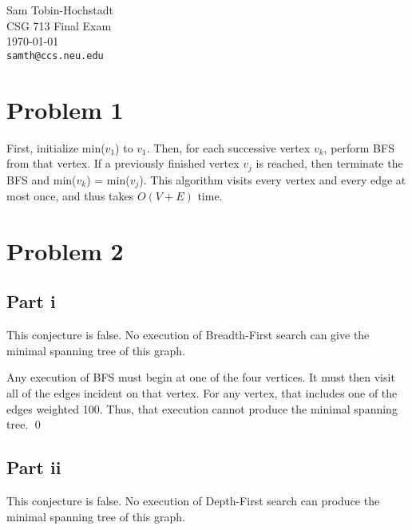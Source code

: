 \documentclass[twoside]{amsart}
\begin{document}
{\raggedleft
Sam Tobin-Hochstadt \\
CSG 713 Final Exam \\
\today \\
{\tt samth@ccs.neu.edu} \\
}


\section*{Problem 1}

First, initialize min($v_1$) to $v_1$.  Then, for each successive
vertex $v_k$, perform BFS from that vertex.  If a previously finished
vertex $v_j$ is reached, then terminate the BFS and min($v_k$) =
min($v_j$). This algorithm visits every vertex and every edge at most
once, and thus takes $O(V + E)$ time.

\section*{Problem 2}

\subsection*{Part i}
This conjecture is false.  No execution of Breadth-First search can
give the minimal spanning tree of this graph.


Any execution of BFS must begin at one of the four vertices.  It must
then visit all of the edges incident on that vertex.  For any vertex,
that includes one of the edges weighted 100.  Thus, that execution
cannot produce the minimal spanning tree. \qed

\subsection*{Part ii}
This conjecture is false. No execution of Depth-First search can
produce the minimal spanning tree of this graph.

\end{document}
